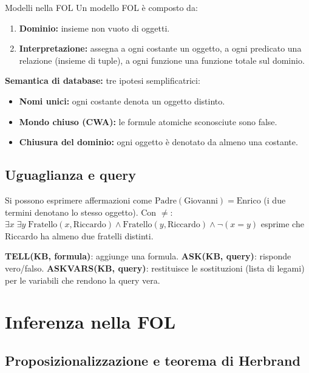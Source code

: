 \documentclass[12pt,a4paper]{article}
\begin{document}
\begin{defbox}{Modelli nella FOL}
Un modello FOL è composto da:
\begin{enumerate}[noitemsep]
  \item \textbf{Dominio:} insieme non vuoto di oggetti.
  \item \textbf{Interpretazione:} assegna a ogni costante un oggetto, a ogni predicato una relazione (insieme di tuple), a ogni funzione una funzione totale sul dominio.
\end{enumerate}

\textbf{Semantica di database:} tre ipotesi semplificatrici:
\begin{itemize}[noitemsep]
  \item \textbf{Nomi unici:} ogni costante denota un oggetto distinto.
  \item \textbf{Mondo chiuso (CWA):} le formule atomiche sconosciute sono false.
  \item \textbf{Chiusura del dominio:} ogni oggetto è denotato da almeno una costante.
\end{itemize}
\end{defbox}

\subsection{Uguaglianza e query}

Si possono esprimere affermazioni come $\text{Padre}(\text{Giovanni}) = \text{Enrico}$ (i due termini denotano lo stesso oggetto). Con $\neq$: $\exists x\; \exists y\; \text{Fratello}(x, \text{Riccardo}) \land \text{Fratello}(y, \text{Riccardo}) \land \neg(x = y)$ esprime che Riccardo ha almeno due fratelli distinti.

\textbf{TELL(KB, formula)}: aggiunge una formula. \textbf{ASK(KB, query)}: risponde vero/falso. \textbf{ASKVARS(KB, query)}: restituisce le sostituzioni (lista di legami) per le variabili che rendono la query vera.

\section{Inferenza nella FOL}

\subsection{Proposizionalizzazione e teorema di Herbrand}
\end{document}
